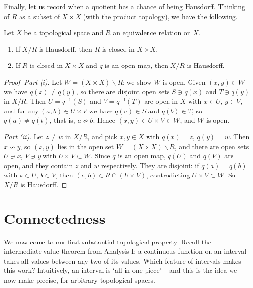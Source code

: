 Finally, let us record when a quotient has a chance of being Hausdorff. Thinking of $R$ as a subset of $X \times X$ (with the product topology), we have the following.

\begin{proposition}
    Let $X$ be a topological space and $R$ an equivalence relation on $X$.
    \begin{enumerate}[label=(\roman*)]
        \item If $X/R$ is Hausdorff, then $R$ is closed in $X \times X$.
        \item If $R$ is closed in $X \times X$ and $q$ is an open map, then $X/R$ is Hausdorff.
    \end{enumerate}
\end{proposition}
\begin{proof}
    \emph{Part (i)}. Let $W = (X \times X) \backslash R$; we show $W$ is open. Given $(x, y) \in W$ we have $q(x) \neq q(y)$, so there are disjoint open sets $S \ni q(x)$ and $T \ni q(y)$ in $X/R$. Then $U = q^{-1}(S)$ and $V = q^{-1}(T)$ are open in $X$ with $x \in U$, $y \in V$, and for any $(a, b) \in U \times V$ we have $q(a) \in S$ and $q(b) \in T$, so $q(a) \neq q(b)$, that is, $a \not\sim b$. Hence $(x, y) \in U \times V \subset W$, and $W$ is open.

    \emph{Part (ii)}. Let $z \neq w$ in $X/R$, and pick $x, y \in X$ with $q(x) = z$, $q(y) = w$. Then $x \not\sim y$, so $(x, y)$ lies in the open set $W = (X \times X) \backslash R$, and there are open sets $U \ni x$, $V \ni y$ with $U \times V \subset W$. Since $q$ is an open map, $q(U)$ and $q(V)$ are open, and they contain $z$ and $w$ respectively. They are disjoint: if $q(a) = q(b)$ with $a \in U$, $b \in V$, then $(a, b) \in R \cap (U \times V)$, contradicting $U \times V \subset W$. So $X/R$ is Hausdorff.
\end{proof}

\section{Connectedness}

We now come to our first substantial topological property. Recall the intermediate value theorem from Analysis I: a continuous function on an interval takes all values between any two of its values. Which feature of intervals makes this work? Intuitively, an interval is `all in one piece' -- and this is the idea we now make precise, for arbitrary topological spaces.

